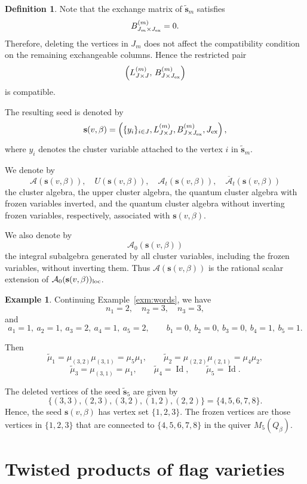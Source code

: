 \documentclass[12pt, reqno]{amsart}
\theoremstyle{plain}
\theoremstyle{definition}
\newtheorem{definition}[theorem]{Definition}
\newtheorem{example}[theorem]{Example}
\numberwithin{equation}{section}
\newcommand{\Id}{\operatorname{Id}}
\newcommand{\cA}{\mathcal{A}}
\begin{document}
\begin{definition}
Note that the exchange matrix of \(\widetilde{\mathbf{s}}_m\) satisfies
\[
B^{(m)}_{J_m\times J_{\rm ex}}=0.
\]
Therefore, deleting the vertices in \(J_m\) does not affect the compatibility
condition on the remaining exchangeable columns. Hence the restricted pair
\[
\left(L^{(m)}_{J\times J},\, B^{(m)}_{J\times J_{\rm ex}}\right)
\]
is compatible.

The resulting seed is denoted by
\[
\mathbf{s}(v,\beta)
=
\left(
\{y_i\}_{i\in J},
L^{(m)}_{J\times J},
B^{(m)}_{J\times J_{\rm ex}},
J_{\rm ex}
\right),
\]
where \(y_i\) denotes the cluster variable attached to the vertex \(i\) in
\(\widetilde{\mathbf{s}}_m\).

We denote by
\[
\cA(\mathbf{s}(v,\beta)),\quad
U(\mathbf{s}(v,\beta)),\quad
\cA_t(\mathbf{s}(v,\beta)),\quad
\overline{\cA}_t(\mathbf{s}(v,\beta))
\]
the cluster algebra, the upper cluster algebra, the quantum cluster algebra
with frozen variables inverted, and the quantum cluster algebra without
inverting frozen variables, respectively, associated with
\(\mathbf{s}(v,\beta)\).

We also denote by
\[
\cA_0(\mathbf{s}(v,\beta))
\]
the integral subalgebra generated by all cluster variables, including the
frozen variables, without inverting them. Thus
\(\cA(\mathbf{s}(v,\beta))\) is the rational scalar extension of
\(\cA_0(\mathbf{s}(v,\beta))_{\rm loc}\).
\end{definition}


\begin{example}\label{exm:mutations}
Continuing Example~\ref{exm:words}, we have
\[
n_1=2,\quad n_2=3,\quad n_3=3,
\]
and
\[
a_1=1,\ a_2=1,\ a_3=2,\ a_4=1,\ a_5=2,
\qquad
b_1=0,\ b_2=0,\ b_3=0,\ b_4=1,\ b_5=1.
\]

Then
\[
\widetilde{\mu}_1=\mu_{(3,2)}\mu_{(3,1)}=\mu_5\mu_1,\qquad
\widetilde{\mu}_2=\mu_{(2,2)}\mu_{(2,1)}=\mu_4\mu_2,
\]
\[
\widetilde{\mu}_3=\mu_{(3,1)}=\mu_1,\qquad
\widetilde{\mu}_4=\Id,\qquad
\widetilde{\mu}_5=\Id.
\]

The deleted vertices of the seed $\widetilde{\mathbf{s}}_5$ are given by
\[
\{(3,3),(2,3),(3,2),(1,2),(2,2)\}=\{4,5,6,7,8\}.
\]
Hence, the seed $\mathbf{s}(v,\beta)$ has vertex set $\{1,2,3\}$.
The frozen vertices are those vertices in $\{1,2,3\}$ that are connected to
$\{4,5,6,7,8\}$ in the quiver $M_5(Q_\beta)$.
\end{example}







\section{Twisted products of flag varieties}\label{sec:twisted}
\end{document}
